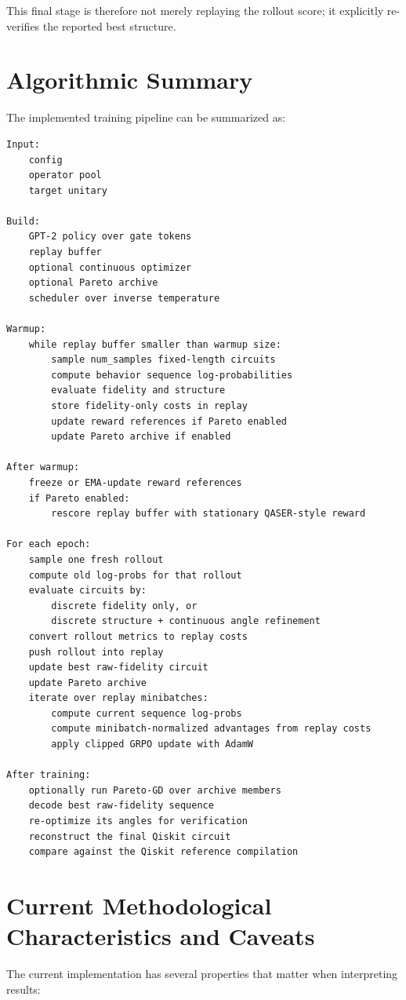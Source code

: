 \documentclass[11pt]{article}
\begin{document}
This final stage is therefore not merely replaying the rollout score; it explicitly re-verifies the reported best structure.

\section{Algorithmic Summary}

The implemented training pipeline can be summarized as:

\begin{verbatim}
Input:
    config
    operator pool
    target unitary

Build:
    GPT-2 policy over gate tokens
    replay buffer
    optional continuous optimizer
    optional Pareto archive
    scheduler over inverse temperature

Warmup:
    while replay buffer smaller than warmup size:
        sample num_samples fixed-length circuits
        compute behavior sequence log-probabilities
        evaluate fidelity and structure
        store fidelity-only costs in replay
        update reward references if Pareto enabled
        update Pareto archive if enabled

After warmup:
    freeze or EMA-update reward references
    if Pareto enabled:
        rescore replay buffer with stationary QASER-style reward

For each epoch:
    sample one fresh rollout
    compute old log-probs for that rollout
    evaluate circuits by:
        discrete fidelity only, or
        discrete structure + continuous angle refinement
    convert rollout metrics to replay costs
    push rollout into replay
    update best raw-fidelity circuit
    update Pareto archive
    iterate over replay minibatches:
        compute current sequence log-probs
        compute minibatch-normalized advantages from replay costs
        apply clipped GRPO update with AdamW

After training:
    optionally run Pareto-GD over archive members
    decode best raw-fidelity sequence
    re-optimize its angles for verification
    reconstruct the final Qiskit circuit
    compare against the Qiskit reference compilation
\end{verbatim}

\section{Current Methodological Characteristics and Caveats}

The current implementation has several properties that matter when interpreting results:
\end{document}
